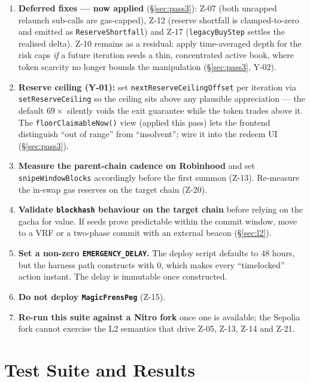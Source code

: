 \documentclass[10pt,a4paper]{article}
\newcommand{\code}[1]{\texttt{\small #1}}
\begin{document}
\begin{enumerate}[leftmargin=1.5em]
\item \textbf{Deferred fixes --- now applied} (\S\ref{sec:pass3}): Z-07 (both uncapped
relaunch sub-calls are gas-capped), Z-12 (reserve shortfall is clamped-to-zero and emitted
as \code{ReserveShortfall}) and Z-17 (\code{legacyBuyStep} settles the realised delta).
Z-10 remains as a residual: apply time-averaged depth for the risk caps \emph{if} a future
iteration seeds a thin, concentrated active book, where token scarcity no longer bounds the
manipulation (\S\ref{sec:pass3}, Y-02).
\item \textbf{Reserve ceiling (Y-01):} set \code{nextReserveCeilingOffset} per iteration via
\code{setReserveCeiling} so the ceiling sits above any plausible appreciation --- the
default $69\times$ silently voids the exit guarantee while the token trades above it. The
\code{floorClaimableNow()} view (applied this pass) lets the frontend distinguish ``out of
range'' from ``insolvent''; wire it into the redeem UI (\S\ref{sec:pass3}).
\item \textbf{Measure the parent-chain cadence on Robinhood} and set
\code{snipeWindowBlocks} accordingly before the first summon (Z-13). Re-measure the in-swap
gas reserves on the target chain (Z-20).
\item \textbf{Validate \code{blockhash} behaviour on the target chain} before relying on the
gacha for value. If seeds prove predictable within the commit window, move to a
VRF or a two-phase commit with an external beacon (\S\ref{sec:l2}).
\item \textbf{Set a non-zero \code{EMERGENCY\_DELAY}.} The deploy script defaults to 48
hours, but the harness path constructs with 0, which makes every ``timelocked'' action
instant. The delay is immutable once constructed.
\item \textbf{Do not deploy \code{MagicFrensPeg}} (Z-15).
\item \textbf{Re-run this suite against a Nitro fork} once one is available; the Sepolia
fork cannot exercise the L2 semantics that drive Z-05, Z-13, Z-14 and Z-21.
\end{enumerate}

\appendix
\section{Test Suite and Results}\label{sec:tests}
\end{document}
